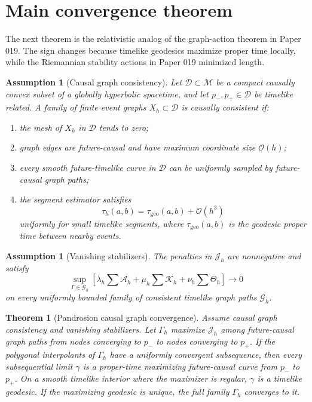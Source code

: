 \documentclass[11pt]{article}
\newtheorem{assumption}[definition]{Assumption}
\newtheorem{theorem}[definition]{Theorem}
\newcommand{\M}{\mathcal M}
\newcommand{\A}{\mathcal A}
\newcommand{\D}{\mathcal D}
\newcommand{\G}{\mathcal G}
\newcommand{\J}{\mathcal J}
\newcommand{\K}{\mathcal K}
\newcommand{\Oterm}{\mathcal O}
\begin{document}
\section{Main convergence theorem}

The next theorem is the relativistic analog of the graph-action theorem in
Paper 019.  The sign changes because timelike geodesics maximize proper time
locally, while the Riemannian stability actions in Paper 019 minimized length.

\begin{assumption}[Causal graph consistency]\label{ass:causalgraph}
Let \(\D\subset\M\) be a compact causally convex subset of a globally
hyperbolic spacetime, and let \(p_-,p_+\in\D\) be timelike related.  A family
of finite event graphs \(X_h\subset\D\) is causally consistent if:
\begin{enumerate}[label=(\roman*)]
\item the mesh of \(X_h\) in \(\D\) tends to zero;
\item graph edges are future-causal and have maximum coordinate size
\(\Oterm(h)\);
\item every smooth future-timelike curve in \(\D\) can be uniformly sampled by
future-causal graph paths;
\item the segment estimator satisfies
\[
        \tau_h(a,b)
        =
        \tau_{\mathrm{geo}}(a,b)+\Oterm(h^3)
\]
uniformly for small timelike segments, where \(\tau_{\mathrm{geo}}(a,b)\) is
the geodesic proper time between nearby events.
\end{enumerate}
\end{assumption}

\begin{assumption}[Vanishing stabilizers]\label{ass:stabilizers}
The penalties in \(\J_h\) are nonnegative and satisfy
\[
        \sup_{\Gamma\in\G_h}
        \left[
        \lambda_h\sum \A_h
        +
        \mu_h\sum \K_h
        +
        \nu_h\sum \Theta_h
        \right]
        \longrightarrow 0
\]
on every uniformly bounded family of consistent timelike graph paths
\(\G_h\).
\end{assumption}

\begin{theorem}[Pandrosion causal graph convergence]\label{thm:causal-convergence}
Assume causal graph consistency and vanishing stabilizers.  Let
\(\Gamma_h\) maximize \(\J_h\) among future-causal graph paths from nodes
converging to \(p_-\) to nodes converging to \(p_+\).  If the polygonal
interpolants of \(\Gamma_h\) have a uniformly convergent subsequence, then
every subsequential limit \(\gamma\) is a proper-time maximizing future-causal
curve from \(p_-\) to \(p_+\).  On a smooth timelike interior where the
maximizer is regular, \(\gamma\) is a timelike geodesic.  If the maximizing
geodesic is unique, the full family \(\Gamma_h\) converges to it.
\end{theorem}
\end{document}
